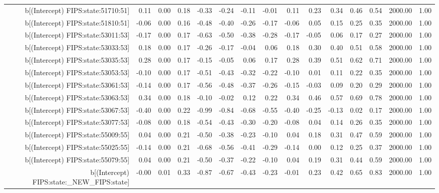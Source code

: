 \begin{table}[ht]
\begin{tabular}{rrrrrrrrrrrrrrr}
  b[(Intercept) FIPS:state:51710:51] & 0.11 & 0.00 & 0.18 & -0.33 & -0.24 & -0.11 & -0.01 & 0.11 & 0.23 & 0.34 & 0.46 & 0.54 & 2000.00 & 1.00 \\ 
  b[(Intercept) FIPS:state:51810:51] & -0.06 & 0.00 & 0.16 & -0.48 & -0.40 & -0.26 & -0.17 & -0.06 & 0.05 & 0.15 & 0.25 & 0.35 & 2000.00 & 1.00 \\ 
  b[(Intercept) FIPS:state:53011:53] & -0.17 & 0.00 & 0.17 & -0.63 & -0.50 & -0.38 & -0.28 & -0.17 & -0.05 & 0.06 & 0.17 & 0.27 & 2000.00 & 1.00 \\ 
  b[(Intercept) FIPS:state:53033:53] & 0.18 & 0.00 & 0.17 & -0.26 & -0.17 & -0.04 & 0.06 & 0.18 & 0.30 & 0.40 & 0.51 & 0.58 & 2000.00 & 1.00 \\ 
  b[(Intercept) FIPS:state:53035:53] & 0.28 & 0.00 & 0.17 & -0.15 & -0.05 & 0.06 & 0.17 & 0.28 & 0.39 & 0.51 & 0.62 & 0.71 & 2000.00 & 1.00 \\ 
  b[(Intercept) FIPS:state:53053:53] & -0.10 & 0.00 & 0.17 & -0.51 & -0.43 & -0.32 & -0.22 & -0.10 & 0.01 & 0.11 & 0.22 & 0.35 & 2000.00 & 1.00 \\ 
  b[(Intercept) FIPS:state:53061:53] & -0.14 & 0.00 & 0.17 & -0.56 & -0.48 & -0.37 & -0.26 & -0.15 & -0.03 & 0.09 & 0.20 & 0.29 & 2000.00 & 1.00 \\ 
  b[(Intercept) FIPS:state:53063:53] & 0.34 & 0.00 & 0.18 & -0.10 & -0.02 & 0.12 & 0.22 & 0.34 & 0.46 & 0.57 & 0.69 & 0.78 & 2000.00 & 1.00 \\ 
  b[(Intercept) FIPS:state:53067:53] & -0.40 & 0.00 & 0.22 & -0.99 & -0.84 & -0.68 & -0.55 & -0.40 & -0.25 & -0.13 & 0.02 & 0.17 & 2000.00 & 1.00 \\ 
  b[(Intercept) FIPS:state:53077:53] & -0.08 & 0.00 & 0.18 & -0.54 & -0.43 & -0.30 & -0.20 & -0.08 & 0.04 & 0.14 & 0.26 & 0.35 & 2000.00 & 1.00 \\ 
  b[(Intercept) FIPS:state:55009:55] & 0.04 & 0.00 & 0.21 & -0.50 & -0.38 & -0.23 & -0.10 & 0.04 & 0.18 & 0.31 & 0.47 & 0.59 & 2000.00 & 1.00 \\ 
  b[(Intercept) FIPS:state:55025:55] & -0.14 & 0.00 & 0.21 & -0.68 & -0.56 & -0.41 & -0.29 & -0.14 & 0.00 & 0.12 & 0.25 & 0.37 & 2000.00 & 1.00 \\ 
  b[(Intercept) FIPS:state:55079:55] & 0.04 & 0.00 & 0.21 & -0.50 & -0.37 & -0.22 & -0.10 & 0.04 & 0.19 & 0.31 & 0.44 & 0.59 & 2000.00 & 1.00 \\ 
  b[(Intercept) FIPS:state:\_NEW\_FIPS:state] & -0.00 & 0.01 & 0.33 & -0.87 & -0.67 & -0.43 & -0.23 & -0.01 & 0.23 & 0.42 & 0.65 & 0.83 & 2000.00 & 1.00 \\ 

\end{tabular}
\end{table}

